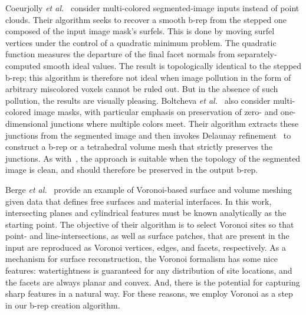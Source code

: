 Coeurjolly \textit{et al.}~\cite{coeurjolly2021} consider multi-colored segmented-image inputs instead of point clouds.  Their algorithm seeks to recover a smooth b-rep from the stepped one composed of the input image mask's surfels.  This is done by moving surfel vertices under the control of a quadratic minimum problem.  The quadratic function measures the departure of the final facet normals from separately-computed smooth ideal values.  The result is topologically identical to the stepped b-rep; this algorithm is therefore not ideal when image pollution in the form of arbitrary miscolored voxels cannot be ruled out.  But in the absence of such pollution, the results are visually pleasing.  Boltcheva \textit{et al.}~\cite{boltcheva2009} also consider multi-colored image masks, with particular emphasis on preservation of zero- and one-dimensional junctions where multiple colors meet.  Their algorithm extracts these junctions from the segmented image and then invokes Delaunay refinement~\cite{pons2007} to construct a b-rep or a tetrahedral volume mesh that strictly preserves the junctions.  As with~\cite{coeurjolly2021}, the approach is suitable when the topology of the segmented image is clean, and should therefore be preserved in the output b-rep.

Berge \textit{et al.}~\cite{berge2019} provide an example of Voronoi-based surface and volume meshing given data that defines free surfaces and material interfaces.  In this work, intersecting planes and cylindrical features must be known analytically as the starting point. The objective of their algorithm is to select Voronoi sites so that point- and line-intersections, as well as surface patches, that are present in the input are reproduced as Voronoi vertices, edges, and facets, respectively.  As a mechanism for surface reconstruction, the Voronoi formalism has some nice features:  watertightness is guaranteed for any distribution of site locations, and the facets are always planar and convex.  And, there is the potential for capturing sharp features in a natural way.  For these reasons, we employ Voronoi as a step in our b-rep creation algorithm.